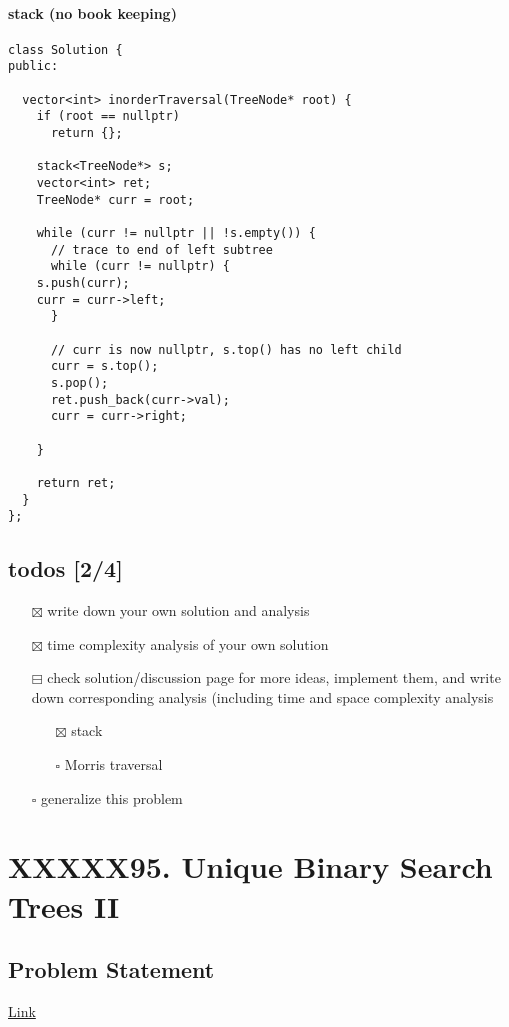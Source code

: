 \documentclass[11pt]{article}
\begin{document}
\paragraph{stack (no book keeping)}
\label{sec:org3fae4e9}
\begin{verbatim}
class Solution {
public:

  vector<int> inorderTraversal(TreeNode* root) {
    if (root == nullptr)
      return {};

    stack<TreeNode*> s;
    vector<int> ret;
    TreeNode* curr = root;

    while (curr != nullptr || !s.empty()) {
      // trace to end of left subtree
      while (curr != nullptr) {
	s.push(curr);
	curr = curr->left;
      }

      // curr is now nullptr, s.top() has no left child
      curr = s.top();
      s.pop();    
      ret.push_back(curr->val);
      curr = curr->right;

    }

    return ret;
  }
};
\end{verbatim}
\subsection{todos [2/4]}
\label{sec:org3c9d8b4}
\begin{itemize}
\item[{$\boxtimes$}] write down your own solution and analysis
\item[{$\boxtimes$}] time complexity analysis of your own solution
\item[{$\boxminus$}] check solution/discussion page for more ideas, implement them, and write down corresponding analysis (including time and space complexity analysis
\begin{itemize}
\item[{$\boxtimes$}] stack
\item[{$\square$}] Morris traversal
\end{itemize}
\item[{$\square$}] generalize this problem
\end{itemize}
\section{XXXXX95. Unique Binary Search Trees II}
\label{sec:org0ba8e6d}
\subsection{Problem Statement}
\label{sec:orgbda504c}
\href{https://leetcode.com/problems/unique-binary-search-trees-ii/}{Link}
\end{document}
